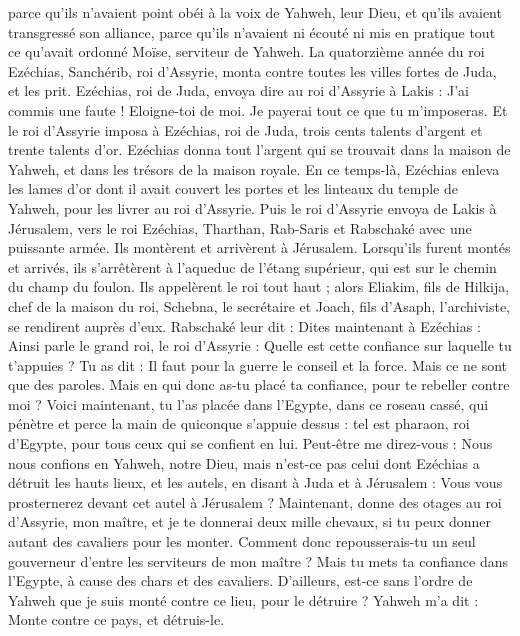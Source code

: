 \begin{multicols}{2}
parce qu’ils n’avaient point obéi à la voix de Yahweh, leur Dieu, et qu’ils avaient transgressé son alliance, parce qu’ils n’avaient ni écouté ni mis en pratique tout ce qu’avait ordonné Moïse, serviteur de Yahweh.
La quatorzième année du roi Ezéchias, Sanchérib, roi d’Assyrie, monta contre toutes les villes fortes de Juda, et les prit.
Ezéchias, roi de Juda, envoya dire au roi d’Assyrie à Lakis : J’ai commis une faute ! Eloigne-toi de moi. Je payerai tout ce que tu m’imposeras. Et le roi d’Assyrie imposa à Ezéchias, roi de Juda, trois cents talents d’argent et trente talents d’or.
Ezéchias donna tout l’argent qui se trouvait dans la maison de Yahweh, et dans les trésors de la maison royale.
En ce temps-là, Ezéchias enleva les lames d’or dont il avait couvert les portes et les linteaux du temple de Yahweh, pour les livrer au roi d’Assyrie.
Puis le roi d’Assyrie envoya de Lakis à Jérusalem, vers le roi Ezéchias, Tharthan, Rab-Saris et Rabschaké avec une puissante armée. Ils montèrent et arrivèrent à Jérusalem. Lorsqu’ils furent montés et arrivés, ils s’arrêtèrent à l’aqueduc de l’étang supérieur, qui est sur le chemin du champ du foulon.
Ils appelèrent le roi tout haut ; alors Eliakim, fils de Hilkija, chef de la maison du roi, Schebna, le secrétaire et Joach, fils d’Asaph, l’archiviste, se rendirent auprès d’eux.
Rabschaké leur dit : Dites maintenant à Ezéchias : Ainsi parle le grand roi, le roi d’Assyrie : Quelle est cette confiance sur laquelle tu t’appuies ?
Tu as dit : Il faut pour la guerre le conseil et la force. Mais ce ne sont que des paroles. Mais en qui donc as-tu placé ta confiance, pour te rebeller contre moi ?
Voici maintenant, tu l’as placée dans l’Egypte, dans ce roseau cassé, qui pénètre et perce la main de quiconque s’appuie dessus : tel est pharaon, roi d’Egypte, pour tous ceux qui se confient en lui.
Peut-être me direz-vous : Nous nous confions en Yahweh, notre Dieu, mais n’est-ce pas celui dont Ezéchias a détruit les hauts lieux, et les autels, en disant à Juda et à Jérusalem : Vous vous prosternerez devant cet autel à Jérusalem ?
Maintenant, donne des otages au roi d’Assyrie, mon maître, et je te donnerai deux mille chevaux, si tu peux donner autant des cavaliers pour les monter.
Comment donc repousserais-tu un seul gouverneur d’entre les serviteurs de mon maître ? Mais tu mets ta confiance dans l’Egypte, à cause des chars et des cavaliers.
D’ailleurs, est-ce sans l’ordre de Yahweh que je suis monté contre ce lieu, pour le détruire ? Yahweh m’a dit : Monte contre ce pays, et détruis-le.

\end{multicols}
